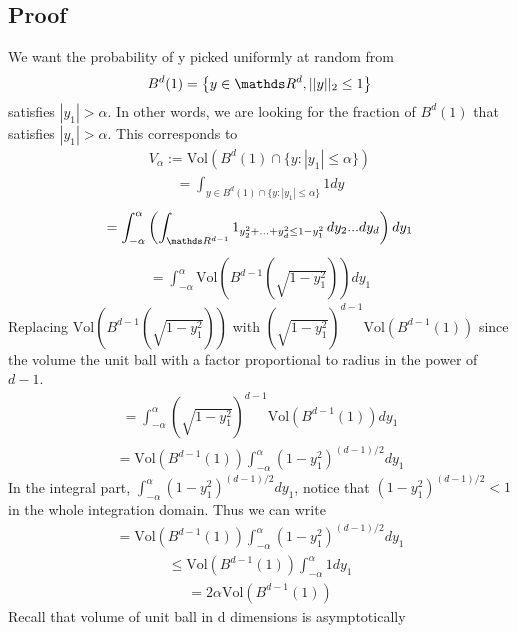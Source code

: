 \documentclass[a4paper, english, headtopline=0.08em, headsepline=0.04em, left = 1cm, right = 1cm, DIV=15]{article}
\begin{document}
\subsection*{Proof}
We want the probability of y picked uniformly at random from
\begin{align*}
	B^d(1)=\left\{y\in\RR^d,||y||_2 \leq 1\right\}
\end{align*}	
satisfies $|y_1|>\alpha$. In other words, we are looking for the fraction of $B^d(1)$ that satisfies $|y_1|>\alpha$.
This corresponds to
\begin{align*}
	V_{\alpha}:=\text{Vol}(B^d(1) \cap \{y : |y_1| \leq \alpha\})
\end{align*}
\begin{align*}
	=\int_{y\in B^d(1) \cap \{y : |y_1| \leq \alpha\}}1dy
\end{align*}
\begin{align*}
	=\int_{-\alpha}^{\alpha} \left(\int_{\RR^{d-1}} 1_{y_2^2+...+y_d^2\leq 1-y_1^2}\,dy_2...dy_d\right)dy_1
\end{align*}
\begin{align*}
=\int_{-\alpha}^{\alpha} \text{Vol}\left(B^{d-1}\left(\sqrt{1-y_1^2}\right)\right)dy_1
\end{align*}
Replacing $\text{Vol}\left(B^{d-1}\left(\sqrt{1-y_1^2}\right)\right)$ with $(\sqrt{1-y_1^2})^{d-1}\text{Vol}\left(B^{d-1}(1)\right)$ since the volume the unit ball with a factor proportional to radius in the power of $d-1$.
\begin{align*}
	=\int_{-\alpha}^{\alpha} (\sqrt{1-y_1^2})^{d-1}\text{Vol}\left(B^{d-1}(1)\right)dy_1
\end{align*}
\begin{align*}
	=\text{Vol}\left(B^{d-1}(1)\right)\int_{-\alpha}^{\alpha} (1-y_1^2)^{(d-1)/2}dy_1
\end{align*}
In the integral part, $\int_{-\alpha}^{\alpha} (1-y_1^2)^{(d-1)/2}dy_1$, notice that $(1-y_1^2)^{(d-1)/2}<1$ in the whole integration domain.
Thus we can write
\begin{align*}
	=\text{Vol}\left(B^{d-1}(1)\right)\int_{-\alpha}^{\alpha} (1-y_1^2)^{(d-1)/2}dy_1
\end{align*}
\begin{align*}
	\leq \text{Vol}\left(B^{d-1}(1)\right)\int_{-\alpha}^{\alpha} 1dy_1
\end{align*}
\begin{align*}
	=2\alpha \text{Vol}\left(B^{d-1}(1)\right)
\end{align*}
Recall that volume of unit ball in d dimensions is asymptotically
\end{document}
